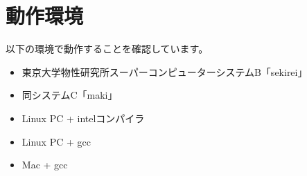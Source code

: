 \section{動作環境}
 以下の環境で動作することを確認しています。

\begin{itemize}
\item 東京大学物性研究所スーパーコンピューターシステムB「sekirei」
\item 同システムC「maki」
\item Linux PC + intelコンパイラ
\item Linux PC + gcc
\item Mac + gcc
\end{itemize}
